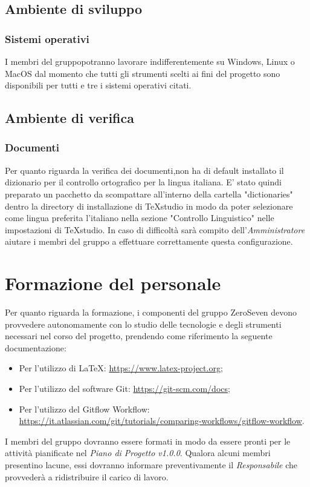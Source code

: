 \subsection{Ambiente di sviluppo}
\subsubsection{Sistemi operativi}
I membri del gruppopotranno lavorare indifferentemente su Windows, Linux o MacOS dal momento che tutti gli strumenti scelti ai fini del progetto sono disponibili per tutti e tre i sistemi operativi citati. 
\subsection{Ambiente di verifica}
\subsubsection{Documenti}
Per quanto riguarda la verifica dei documenti,non ha di default installato il dizionario per il controllo ortografico per la lingua italiana. E' stato quindi preparato un pacchetto da scompattare all'interno della cartella "dictionaries" dentro la directory di installazione di TeXstudio in modo da poter selezionare come lingua preferita l'italiano nella sezione "Controllo Linguistico" nelle impostazioni di TeXstudio.  In caso di difficoltà sarà compito dell'\textit{Amministratore} aiutare i membri del gruppo a effettuare correttamente questa configurazione.
\section{Formazione del personale}
Per quanto riguarda la formazione, i componenti del gruppo ZeroSeven devono provvedere autonomamente con lo studio delle tecnologie e degli strumenti necessari nel corso del progetto, prendendo come riferimento la seguente documentazione:
\begin{itemize}
	\item Per l'utilizzo di \LaTeX: \url{https://www.latex-project.org};
	\item Per l'utilizzo del software Git: \url{https://git-scm.com/docs};
	\item Per l'utilizzo del Gitflow Workflow: \url{https://it.atlassian.com/git/tutorials/comparing-workflows/gitflow-workflow}.
\end{itemize}
I membri del gruppo dovranno essere formati in modo da essere pronti per le attività pianificate nel \textit{Piano di Progetto v1.0.0}. Qualora alcuni membri presentino lacune, essi dovranno informare preventivamente il \textit{Responsabile} che provvederà a ridistribuire il carico di lavoro. 